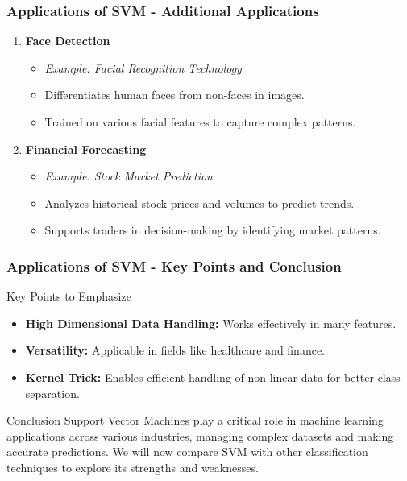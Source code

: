 \documentclass[aspectratio=169]{beamer}
\begin{document}
\begin{frame}[fragile]
    \frametitle{Applications of SVM - Additional Applications}
    \begin{enumerate}[resume]
        \item \textbf{Face Detection}
        \begin{itemize}
            \item \textit{Example: Facial Recognition Technology}
            \item Differentiates human faces from non-faces in images.
            \item Trained on various facial features to capture complex patterns.
        \end{itemize}

        \item \textbf{Financial Forecasting}
        \begin{itemize}
            \item \textit{Example: Stock Market Prediction}
            \item Analyzes historical stock prices and volumes to predict trends.
            \item Supports traders in decision-making by identifying market patterns.
        \end{itemize}
    \end{enumerate}
\end{frame}

\begin{frame}[fragile]
    \frametitle{Applications of SVM - Key Points and Conclusion}
    \begin{block}{Key Points to Emphasize}
        \begin{itemize}
            \item \textbf{High Dimensional Data Handling:} Works effectively in many features.
            \item \textbf{Versatility:} Applicable in fields like healthcare and finance.
            \item \textbf{Kernel Trick:} Enables efficient handling of non-linear data for better class separation.
        \end{itemize}
    \end{block}
    
    \begin{block}{Conclusion}
        Support Vector Machines play a critical role in machine learning applications across various industries, managing complex datasets and making accurate predictions. 
        We will now compare SVM with other classification techniques to explore its strengths and weaknesses.
    \end{block}
\end{frame}
\end{document}
